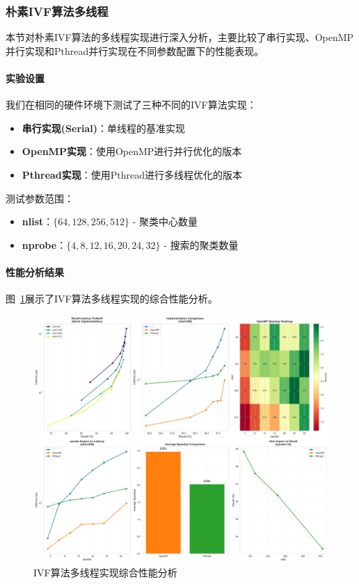 \subsubsection{朴素IVF算法多线程}

本节对朴素IVF算法的多线程实现进行深入分析，主要比较了串行实现、OpenMP并行实现和Pthread并行实现在不同参数配置下的性能表现。

\paragraph{实验设置}

我们在相同的硬件环境下测试了三种不同的IVF算法实现：
\begin{itemize}
    \item \textbf{串行实现(Serial)}：单线程的基准实现
    \item \textbf{OpenMP实现}：使用OpenMP进行并行优化的版本
    \item \textbf{Pthread实现}：使用Pthread进行多线程优化的版本
\end{itemize}

测试参数范围：
\begin{itemize}
    \item \textbf{nlist}：$\{64, 128, 256, 512\}$ - 聚类中心数量
    \item \textbf{nprobe}：$\{4, 8, 12, 16, 20, 24, 32\}$ - 搜索的聚类数量
\end{itemize}

\paragraph{性能分析结果}

图~\ref{fig:ivf_comprehensive}展示了IVF算法多线程实现的综合性能分析。

\begin{figure}[htbp]
    \centering
    \includegraphics[width=\textwidth]{results/plots/ivf_comprehensive_analysis.png}
    \caption{IVF算法多线程实现综合性能分析}
    \label{fig:ivf_comprehensive}
\end{figure}

